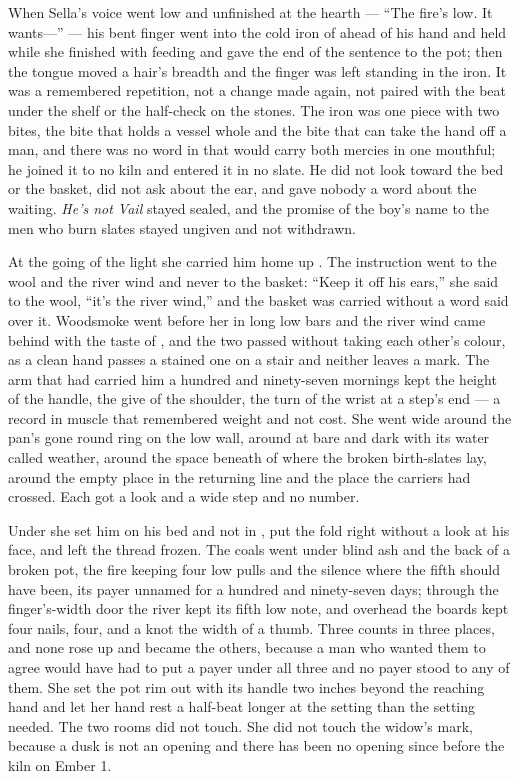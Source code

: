When Sella's voice went low and unfinished at the hearth --- “The fire's low. It wants---” --- his bent finger went into the cold iron of  ahead of his hand and held while she finished with feeding and gave the end of the sentence to the pot; then the tongue moved a hair's breadth and the finger was left standing in the iron. It was a remembered repetition, not a change made again, not paired with the beat under the shelf or the half-check on the stones. The iron was one piece with two bites, the bite that holds a vessel whole and the bite that can take the hand off a man, and there was no word in  that would carry both mercies in one mouthful; he joined it to no kiln and entered it in no slate. He did not look toward the bed or the basket, did not ask about the ear, and gave nobody a word about the waiting. \emph{He's not Vail} stayed sealed, and the promise of the boy's name to the men who burn slates stayed ungiven and not withdrawn.

\scenebreak

At the going of the light she carried him home up . The instruction went to the wool and the river wind and never to the basket: “Keep it off his ears,” she said to the wool, “it's the river wind,” and the basket was carried without a word said over it. Woodsmoke went before her in long low bars and the river wind came behind with the taste of , and the two passed without taking each other's colour, as a clean hand passes a stained one on a stair and neither leaves a mark. The arm that had carried him a hundred and ninety-seven mornings kept the height of the handle, the give of the shoulder, the turn of the wrist at a step's end --- a record in muscle that remembered weight and not cost. She went wide around the pan's gone round ring on the low wall, around  at  bare and dark with its water called weather, around the space beneath  of  where the broken birth-slates lay, around the empty place in the returning line and the place the carriers had crossed. Each got a look and a wide step and no number.

Under  she set him on his bed and not in , put the fold right without a look at his face, and left the thread frozen. The coals went under blind ash and the back of a broken pot, the fire keeping four low pulls and the silence where the fifth should have been, its payer unnamed for a hundred and ninety-seven days; through the finger's-width door the river kept its fifth low note, and overhead the boards kept four nails, four, and a knot the width of a thumb. Three counts in three places, and none rose up and became the others, because a man who wanted them to agree would have had to put a payer under all three and no payer stood to any of them. She set the pot rim out with its handle two inches beyond the reaching hand and let her hand rest a half-beat longer at the setting than the setting needed. The two rooms did not touch. She did not touch the widow's mark, because a dusk is not an opening and there has been no opening since before the kiln on Ember 1.


